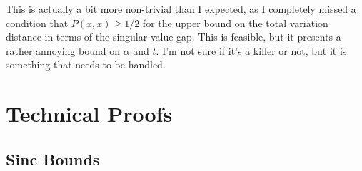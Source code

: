 \documentclass[
 amsmath,amssymb,
 aps,
onecolumn, 
nofootinbib]{revtex4-2}
\begin{document}
This is actually a bit more non-trivial than I expected, as I completely missed a condition that $P(x,x) \ge 1/2$ for the upper bound on the total variation distance in terms of the singular value gap. This is feasible, but it presents a rather annoying bound on $\alpha$ and $t$. I'm not sure if it's a killer or not, but it is something that needs to be handled. 

\section{Technical Proofs} \label{sec:appendix}
\subsection{Sinc Bounds} \label{sec:appendix_sinc}
\end{document}
